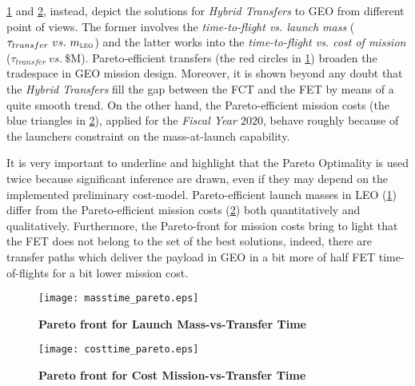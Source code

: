 \figurename\ref{fig:paretomasstime} and \figurename\ref{fig:paretocosttime}, instead, depict the solutions for \emph{Hybrid Transfers} to GEO from different point of views.
The former involves the \emph{time-to-flight vs. launch mass} ($\tau_{\scriptstyle{transfer}}~vs.~m_{\scriptstyle{\textsc{leo}}}$) and the latter works into the \emph{time-to-flight vs. cost of mission} ($\tau_{\scriptstyle{transfer}}~vs.~\$\si\mega$).
Pareto-efficient transfers (the red circles in \figurename\ref{fig:paretomasstime}) broaden the tradespace in GEO mission design.
Moreover, it is shown beyond any doubt that the \emph{Hybrid Transfers} fill the gap between the FCT and the FET by means of a quite smooth trend.
On the other hand, the Pareto-efficient mission costs (the blue triangles in \figurename \ref{fig:paretocosttime}), applied for the \emph{Fiscal Year $2020$}, behave roughly because of the launchers constraint on the mass-at-launch capability.

It is very important to underline and highlight that the Pareto Optimality is used twice because significant inference are drawn, even if they may depend on the implemented preliminary cost-model. 
Pareto-efficient launch masses in LEO (\figurename\ref{fig:paretomasstime}) differ from the Pareto-efficient mission costs (\figurename\ref{fig:paretocosttime}) both quantitatively and qualitatively.
Furthermore, the Pareto-front for mission costs bring to light that the FET does not belong to the set of the best solutions, indeed, there are transfer paths which deliver the payload in GEO in a bit more of half FET time-of-flights for a bit lower mission cost.
%
\begin{figure}
\centering
\texttt{[image: masstime\_pareto.eps]}
\caption{\textbf{Pareto front for Launch Mass-vs-Transfer Time}}
\label{fig:paretomasstime}
\end{figure}
%
\begin{figure}
\centering
\texttt{[image: costtime\_pareto.eps]}
\caption{\textbf{Pareto front for Cost Mission-vs-Transfer Time}}
\label{fig:paretocosttime}
\end{figure}
%